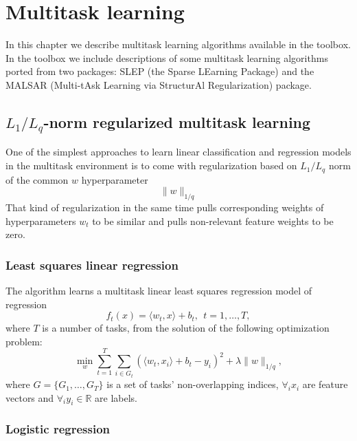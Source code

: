 %

\chapter{Multitask learning}

In this chapter we describe multitask learning algorithms available in the 
\shogun{} toolbox. In the toolbox we include descriptions of some multitask 
learning algorithms ported from two packages: SLEP (the Sparse LEarning 
Package) and the MALSAR (Multi-tAsk Learning via StructurAl Regularization) 
package.

\section{$L_1/L_q$-norm regularized multitask learning}

One of the simplest approaches to learn linear classification and regression models in the 
multitask environment is to come with regularization based on $L_1/L_q$ norm 
of the common $w$ hyperparameter
$$
\| w \|_{1/q}
$$ 
That kind of regularization in the same time pulls corresponding weights 
of hyperparameters $w_t$ to be similar and pulls non-relevant feature weights
to be zero.

\subsection{Least squares linear regression}

The algorithm learns a multitask linear least squares regression model of regression 
$$
f_t(x) = \langle w_t,x \rangle + b_t, ~~ t = 1, \dots, T,
$$
where $T$ is a number of tasks, from the solution of the following optimization problem:
$$
\min_w \sum_{t=1}^{T} \sum_{i \in G_t} \left(\langle w_t,x_i \rangle + b_t - y_i\right)^2
+ \lambda \| w \|_{1/q},
$$
where $G = \{ G_1, \dots, G_T \}$ is a set of tasks' non-overlapping indices, $\forall_i x_i$ are feature 
vectors and $\forall_i y_i \in \mathbb{R}$ are labels.

\subsection{Logistic regression}

